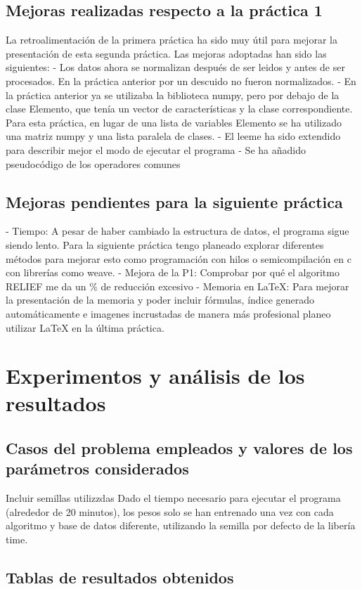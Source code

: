 \documentclass[12pt, spanish]{article}
\begin{document}
\subsection{Mejoras realizadas respecto a la práctica 1}
La retroalimentación de la primera práctica ha sido muy útil para mejorar la presentación de esta segunda práctica. Las mejoras adoptadas han sido las siguientes:
- Los datos ahora se normalizan después de ser leidos y antes de ser procesados. En la práctica anterior por un descuido no fueron normalizados. 
- En la práctica anterior ya se utilizaba la biblioteca numpy, pero por debajo de la clase Elemento, que tenía un vector de características y la clase correspondiente. Para esta práctica, en lugar de una lista de variables Elemento se ha utilizado una matriz numpy y una lista paralela de clases.
- El leeme ha sido extendido para describir mejor el modo de ejecutar el programa
- Se ha añadido pseudocódigo de los operadores comunes 
\subsection{Mejoras pendientes para la siguiente práctica}
- Tiempo: A pesar de haber cambiado la estructura de datos, el programa sigue siendo lento. Para la siguiente práctica tengo planeado explorar diferentes métodos para mejorar esto como programación con hilos o semicompilación en c con librerías como weave. 
- Mejora de la P1: Comprobar por qué el algoritmo RELIEF me da un \% de reducción excesivo
- Memoria en LaTeX:  Para mejorar la presentación de la memoria y poder incluir fórmulas, índice generado automáticamente e imagenes incrustadas de manera más profesional planeo utilizar LaTeX en la última práctica. 

\section{Experimentos y análisis de los resultados}
\subsection{Casos del problema empleados y valores de los parámetros considerados}
Incluir semillas utilizzdas
Dado el tiempo necesario para ejecutar el programa (alrededor de 20 minutos), los pesos solo se han entrenado una vez con cada algoritmo y base de datos diferente, utilizando la semilla por defecto de la libería time. 

\subsection{Tablas de resultados obtenidos}
\pagebreak
\end{document}
